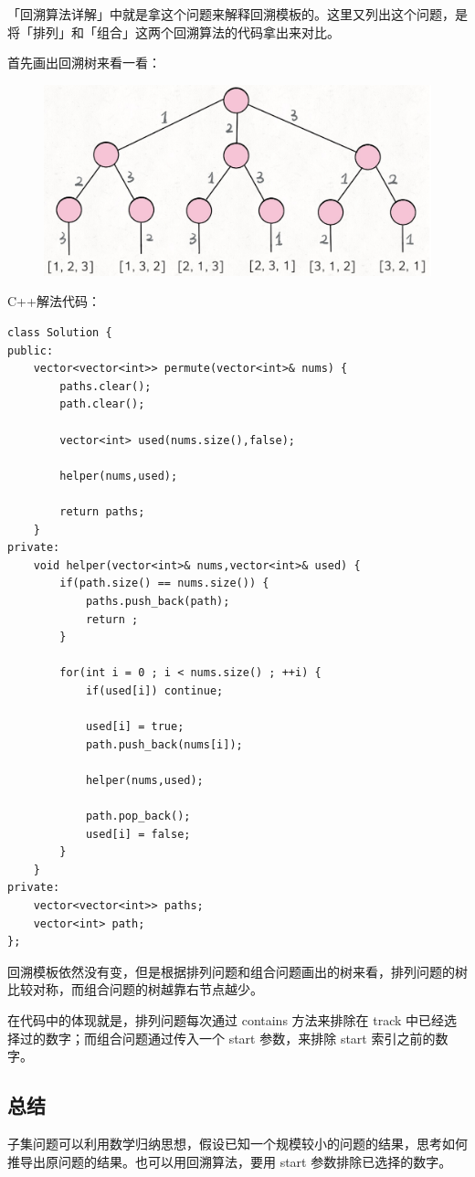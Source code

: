 \documentclass[12pt]{article}
\begin{document}
「回溯算法详解」中就是拿这个问题来解释回溯模板的。这里又列出这个问题，是将「排列」和「组合」这两个回溯算法的代码拿出来对比。

首先画出回溯树来看一看：
\begin{figure}[H]
    \centering
    \includegraphics[width=.6\textwidth]{fig/Permutation.png}
\end{figure}

C++解法代码：
\begin{lstlisting}
class Solution {
public:
    vector<vector<int>> permute(vector<int>& nums) {
        paths.clear();
        path.clear();

        vector<int> used(nums.size(),false);

        helper(nums,used);

        return paths;
    }
private:
    void helper(vector<int>& nums,vector<int>& used) {
        if(path.size() == nums.size()) {
            paths.push_back(path);
            return ;
        }

        for(int i = 0 ; i < nums.size() ; ++i) {
            if(used[i]) continue;

            used[i] = true;
            path.push_back(nums[i]);
            
            helper(nums,used);

            path.pop_back();
            used[i] = false;
        }
    }
private:
    vector<vector<int>> paths;
    vector<int> path;
};
\end{lstlisting}

回溯模板依然没有变，但是根据排列问题和组合问题画出的树来看，排列问题的树比较对称，而组合问题的树越靠右节点越少。

在代码中的体现就是，排列问题每次通过 contains 方法来排除在 track 中已经选择过的数字；而组合问题通过传入一个 start 参数，来排除 start 索引之前的数字。

\subsection{总结}
子集问题可以利用数学归纳思想，假设已知一个规模较小的问题的结果，思考如何推导出原问题的结果。也可以用回溯算法，要用 start 参数排除已选择的数字。
\end{document}
